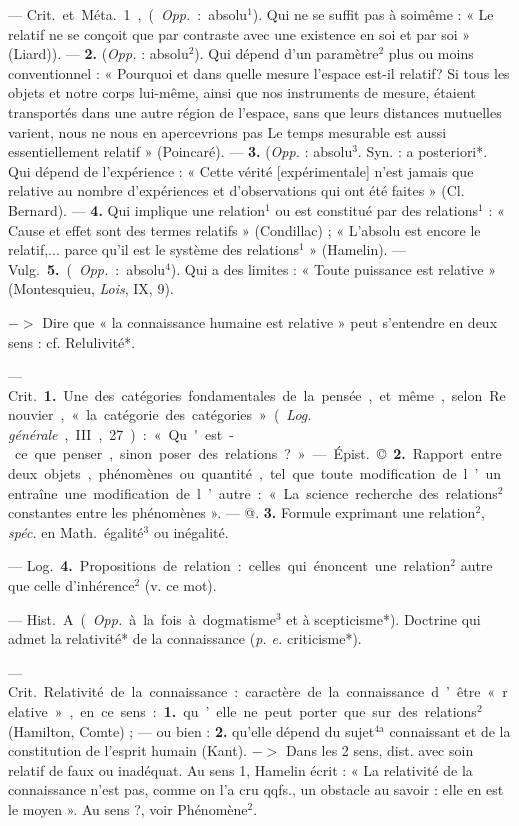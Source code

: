 \begin{itemize}[leftmargin=1cm, label=, itemsep=1pt]
 — \si{Crit.} et \si{Méta.} 1, ({\it Opp.} :
absolu$^1$). Qui ne se suffit pas à soimême : « Le relatif ne se conçoit que
par contraste avec une existence en
soi et par soi » (Liard)). — {\bf 2.} ({\it Opp.} :
absolu$^2$). Qui dépend d'un paramètre$^2$ plus ou moins conventionnel :
« Pourquoi et dans quelle mesure
l’espace est-il relatif? Si tous les
objets et notre corps lui-même, ainsi
que nos instruments de mesure,
étaient transportés dans une autre
région de l'espace, sans que leurs
distances mutuelles varient, nous
ne nous en apercevrions pas Le
temps mesurable est aussi essentiellement relatif » (Poincaré). — {\bf 3.}
({\it Opp.} : absolu$^3$. Syn. : a posteriori*.
Qui dépend de l'expérience : « Cette
vérité [expérimentale] n’est jamais
que relative au nombre d’expériences et d'observations qui ont été
faites » (Cl. Bernard). — {\bf 4.} Qui implique une relation$^1$ ou est constitué
par des relations$^1$ : « Cause et effet
sont des termes relatifs » (Condillac) ;
« L’absolu est encore le relatif,...
parce qu'il est le système des relations$^1$ » (Hamelin). — \si{Vulg.} {\bf 5.} ({\it Opp.} :
absolu$^4$). Qui a des limites : « Toute
puissance est relative » (Montesquieu, {\it Lois}, IX, 9).

$->$ Dire que « la connaissance
humaine est relative » peut s’entendre en deux sens : cf. Relulivité*.

 — \si{Crit.} {\bf 1.} Une des catégories fondamentales de la pensée,
et même, selon Renouvier, « la
catégorie des catégories » ({\it Log. générale}, III, 27) : « Qu'est-ce que penser,
sinon poser des relations ? »

— \si{Épist.} ©. {\bf 2.} Rapport entre
deux objets, phénomènes ou quantité,
tel que toute modification de
l’un entraîne une modification de
l’autre : « La science recherche des
relations$^2$ constantes entre les phénomènes ». — @. {\bf 3.} Formule exprimant une relation$^2$, {\it spéc.} en \si{Math.}
égalité$^3$ ou inégalité.

— \si{Log.} {\bf 4.} Propositions de relation : celles qui énoncent une relation$^2$ autre que celle d’inhérence$^2$
(v. ce mot).

 — \si{Hist.} A. ({\it Opp.} à la
fois à dogmatisme$^3$ et à scepticisme*).
Doctrine qui admet la relativité* de
la connaissance ({\it p. e.} criticisme*).

 — \si{Crit.} Relativité de la
connaissance : caractère de la connaissance d’être « relative », en ce
sens : {\bf 1.} qu’elle ne peut porter que
sur des relations$^2$ (Hamilton, Comte) ;
— ou bien : {\bf 2.} qu’elle dépend du
sujet$^\text{4a}$ connaissant et de la constitution de l'esprit humain (Kant).
$->$ Dans les 2 sens, dist. avec soin
relatif de faux ou inadéquat. Au
sens 1, Hamelin écrit : « La relativité
de la connaissance n’est pas, comme
on l’a cru qqfs., un obstacle au
savoir : elle en est le moyen ». Au
sens ?, voir Phénomène$^2$.


\end{itemize}
